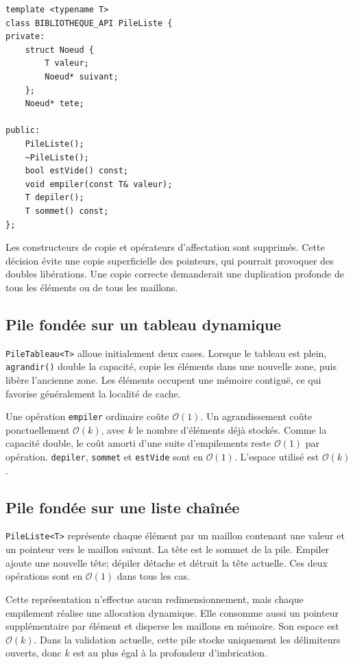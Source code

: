 \documentclass[11pt,a4paper]{article}
\newcommand{\complexite}[1]{\ensuremath{\mathcal{O}(#1)}}
\begin{document}
\begin{lstlisting}[style=cppstyle,caption={Extrait de l'interface générique}]
template <typename T>
class BIBLIOTHEQUE_API PileListe {
private:
    struct Noeud {
        T valeur;
        Noeud* suivant;
    };
    Noeud* tete;

public:
    PileListe();
    ~PileListe();
    bool estVide() const;
    void empiler(const T& valeur);
    T depiler();
    T sommet() const;
};
\end{lstlisting}

Les constructeurs de copie et opérateurs d'affectation sont supprimés. Cette décision évite une copie superficielle des pointeurs, qui pourrait provoquer des doubles libérations. Une copie correcte demanderait une duplication profonde de tous les éléments ou de tous les maillons.

\subsection{Pile fondée sur un tableau dynamique}

\texttt{PileTableau<T>} alloue initialement deux cases. Lorsque le tableau est plein, \texttt{agrandir()} double la capacité, copie les éléments dans une nouvelle zone, puis libère l'ancienne zone. Les éléments occupent une mémoire contiguë, ce qui favorise généralement la localité de cache.

Une opération \texttt{empiler} ordinaire coûte \complexite{1}. Un agrandissement coûte ponctuellement \complexite{k}, avec $k$ le nombre d'éléments déjà stockés. Comme la capacité double, le coût amorti d'une suite d'empilements reste \complexite{1} par opération. \texttt{depiler}, \texttt{sommet} et \texttt{estVide} sont en \complexite{1}. L'espace utilisé est \complexite{k}.

\subsection{Pile fondée sur une liste chaînée}

\texttt{PileListe<T>} représente chaque élément par un maillon contenant une valeur et un pointeur vers le maillon suivant. La tête est le sommet de la pile. Empiler ajoute une nouvelle tête; dépiler détache et détruit la tête actuelle. Ces deux opérations sont en \complexite{1} dans tous les cas.

Cette représentation n'effectue aucun redimensionnement, mais chaque empilement réalise une allocation dynamique. Elle consomme aussi un pointeur supplémentaire par élément et disperse les maillons en mémoire. Son espace est \complexite{k}. Dans la validation actuelle, cette pile stocke uniquement les délimiteurs ouverts, donc $k$ est au plus égal à la profondeur d'imbrication.
\end{document}
